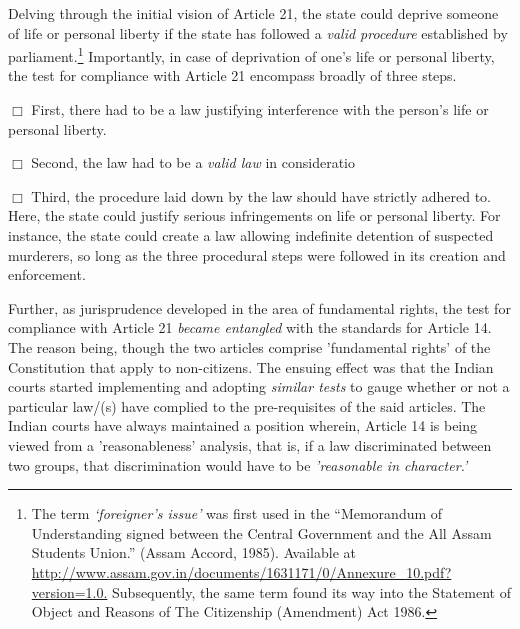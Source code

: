 \begin{multicols}{2}
\noi
Delving through the initial vision of Article 21, the state could deprive someone of life or
personal liberty if the state has followed a \textit{valid procedure} established by
parliament.\footnote{The term \textit{‘foreigner’s issue’} was first used in the “Memorandum of Understanding signed between the Central Government and the All Assam Students Union.” (Assam Accord, 1985). Available at\\ \url{http://www.assam.gov.in/documents/1631171/0/Annexure_10.pdf?version=1.0.} Subsequently, the same term
found its way into the Statement of Object and Reasons of The Citizenship (Amendment) Act 1986.} Importantly, in case of deprivation of one's life or personal liberty, the test for
compliance with Article 21 encompass broadly of three steps.

\vspace{-.1cm}

\noi
$\Box$ First, there had to be a law justifying interference with the person's life or personal liberty.

\vspace{-.1cm}

\noi
$\Box$ Second, the law had to be a \textit{valid law} in consideratio

\vspace{-.1cm}

\noi
$\Box$  Third, the procedure laid down by the law should have strictly adhered to. Here, the state
could justify serious infringements on life or personal liberty. For instance, the state could
create a law allowing indefinite detention of suspected murderers, so long as the three
procedural steps were followed in its creation and enforcement.

\vspace{-.1cm}

\noi
Further, as jurisprudence developed in the area of fundamental rights, the test for compliance
with Article 21 \textit{became entangled} with the standards for Article 14. The reason being, though
the two articles comprise 'fundamental rights' of the Constitution that apply to non-citizens.
The ensuing effect was that the Indian courts started implementing and adopting \textit{similar tests}
to gauge whether or not a particular law/(s) have complied to the pre-requisites of the said
articles. The Indian courts have always maintained a position wherein, Article 14 is being
viewed from a 'reasonableness' analysis, that is, if a law discriminated between two groups,
that discrimination would have to be \textit{'reasonable in character.'}


\end{multicols}
